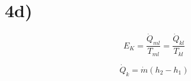 

\section*{4d)}
\[
E_{K} = \frac{\dot{Q}_{ml}}{T_{ml}} = \frac{\dot{Q}_{kl}}{T_{kl}}
\]

\[
\dot{Q}_{k} = \dot{m}(h_{2} - h_{1})
\]